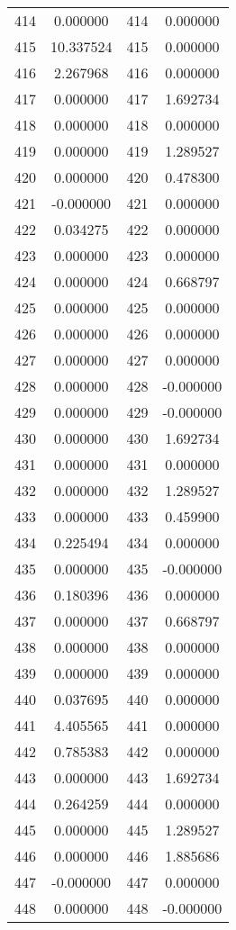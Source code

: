 \documentclass[12pt]{article}
\begin{document}
\begin{longtable}{@{}cccc@{}}
414 & 0.000000 & 414 & 0.000000 \\
415 & 10.337524 & 415 & 0.000000 \\
416 & 2.267968 & 416 & 0.000000 \\
417 & 0.000000 & 417 & 1.692734 \\
418 & 0.000000 & 418 & 0.000000 \\
419 & 0.000000 & 419 & 1.289527 \\
420 & 0.000000 & 420 & 0.478300 \\
421 & -0.000000 & 421 & 0.000000 \\
422 & 0.034275 & 422 & 0.000000 \\
423 & 0.000000 & 423 & 0.000000 \\
424 & 0.000000 & 424 & 0.668797 \\
425 & 0.000000 & 425 & 0.000000 \\
426 & 0.000000 & 426 & 0.000000 \\
427 & 0.000000 & 427 & 0.000000 \\
428 & 0.000000 & 428 & -0.000000 \\
429 & 0.000000 & 429 & -0.000000 \\
430 & 0.000000 & 430 & 1.692734 \\
431 & 0.000000 & 431 & 0.000000 \\
432 & 0.000000 & 432 & 1.289527 \\
433 & 0.000000 & 433 & 0.459900 \\
434 & 0.225494 & 434 & 0.000000 \\
435 & 0.000000 & 435 & -0.000000 \\
436 & 0.180396 & 436 & 0.000000 \\
437 & 0.000000 & 437 & 0.668797 \\
438 & 0.000000 & 438 & 0.000000 \\
439 & 0.000000 & 439 & 0.000000 \\
440 & 0.037695 & 440 & 0.000000 \\
441 & 4.405565 & 441 & 0.000000 \\
442 & 0.785383 & 442 & 0.000000 \\
443 & 0.000000 & 443 & 1.692734 \\
444 & 0.264259 & 444 & 0.000000 \\
445 & 0.000000 & 445 & 1.289527 \\
446 & 0.000000 & 446 & 1.885686 \\
447 & -0.000000 & 447 & 0.000000 \\
448 & 0.000000 & 448 & -0.000000 \\

\end{longtable}
\end{document}
